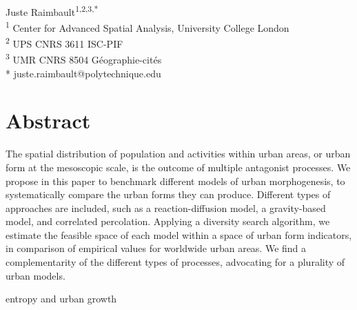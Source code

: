\documentclass[10pt,letterpaper]{article}
\begin{document}
\vspace*{0.2in}

\begin{flushleft}
{\Large
\textbf{} %
}
\newline
\\
Juste Raimbault\textsuperscript{1,2,3,*}
\bigskip\\
\textsuperscript{1} Center for Advanced Spatial Analysis, University College London
\\
\textsuperscript{2} UPS CNRS 3611 ISC-PIF
\\
\textsuperscript{3} UMR CNRS 8504 G{\'e}ographie-cit{\'e}s
\bigskip\\
* juste.raimbault@polytechnique.edu



\end{flushleft}

\section*{Abstract}
\vspace{1cm}
The spatial distribution of population and activities within urban areas, or urban form at the mesoscopic scale, is the outcome of multiple antagonist processes. We propose in this paper to benchmark different models of urban morphogenesis, to systematically compare the urban forms they can produce. Different types of approaches are included, such as a reaction-diffusion model, a gravity-based model, and correlated percolation. Applying a diversity search algorithm, we estimate the feasible space of each model within a space of urban form indicators, in comparison of empirical values for worldwide urban areas. We find a complementarity of the different types of processes, advocating for a plurality of urban models.



\linenumbers


\cite{jun2020modling} entropy and urban growth
\end{document}
